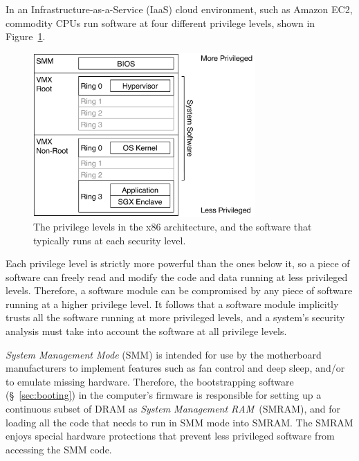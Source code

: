 \label{sec:rings}


In an Infrastructure-as-a-Service (IaaS) cloud environment, such as Amazon EC2,
commodity CPUs run software at four different privilege levels, shown in
Figure~\ref{fig:cpu_rings}.

\begin{figure}[hbtp]
  \centering
  \includegraphics[width=85mm]{figures/cpu_rings.pdf}
  \caption{
    The privilege levels in the x86 architecture, and the software that
    typically runs at each security level.
  }
  \label{fig:cpu_rings}
\end{figure}

Each privilege level is strictly more powerful than the ones below it, so a
piece of software can freely read and modify the code and data running at less
privileged levels. Therefore, a software module can be compromised by any piece
of software running at a higher privilege level. It follows that a software
module implicitly trusts all the software running at more privileged levels,
and a system's security analysis must take into account the software at all
privilege levels.


\textit{System Management Mode} (SMM) is intended for use by the motherboard
manufacturers to implement features such as fan control and deep sleep, and/or
to emulate missing hardware. Therefore, the bootstrapping software
(\S~\ref{sec:booting}) in the computer's firmware is responsible for setting up
a continuous subset of DRAM as \textit{System Management RAM}~(SMRAM), and for
loading all the code that needs to run in SMM mode into SMRAM. The SMRAM
enjoys special hardware protections that prevent less privileged software from
accessing the SMM code.

